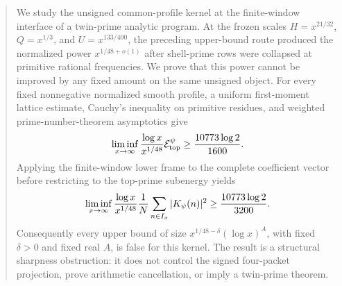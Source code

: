 \begin{abstract}
We study the unsigned common-profile kernel at the finite-window interface of a
twin-prime analytic program.  At the frozen scales
$H=x^{21/32}$, $Q=x^{1/3}$, and $U=x^{133/400}$, the preceding upper-bound
route produced the normalized power $x^{1/48+o(1)}$ after shell-prime rows were
collapsed at primitive rational frequencies.  We prove that this power cannot
be improved by any fixed amount on the same unsigned object.  For every fixed
nonnegative normalized smooth profile, a uniform first-moment lattice estimate,
Cauchy's inequality on primitive residues, and weighted prime-number-theorem
asymptotics give
\[
 \liminf_{x\to\infty}\frac{\log x}{x^{1/48}}\Etop
 \geq \frac{10773\log 2}{1600}.
\]
Applying the finite-window lower frame to the complete coefficient vector
before restricting to the top-prime subenergy yields
\[
 \liminf_{x\to\infty}\frac{\log x}{x^{1/48}}
 \meanIx |K_\psi(n)|^2
 \geq \frac{10773\log 2}{3200}.
\]
Consequently every upper bound of size
$x^{1/48-\delta}(\log x)^A$, with fixed $\delta>0$ and fixed real $A$, is
false for this kernel.  The result is a structural sharpness obstruction: it
does not control the signed four-packet projection, prove arithmetic
cancellation, or imply a twin-prime theorem.
\end{abstract}
